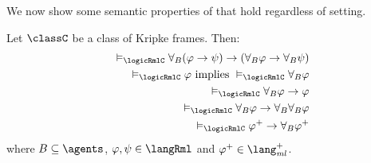 We now show some semantic properties of \logicRml{} that hold regardless of setting.

\begin{proposition}\label{rml-validities}
Let $\classC$ be a class of Kripke frames. Then:
\begin{eqnarray}
    &&\entails_\logicRmlC \allrefsBs (\phi \implies \psi) \implies (\allrefsBs \phi \implies \allrefsBs \psi) \label{rml-validity-r}\\
    &&\entails_\logicRmlC \phi \text{ implies } \entails_\logicRmlC \allrefsBs \phi \label{rml-validity-necr}\\
    &&\entails_\logicRmlC \allrefsBs \phi \implies \phi \label{rml-validity-rt}\\
    &&\entails_\logicRmlC \allrefsBs \phi \implies \allrefsBs \allrefsBs \phi \label{rml-validity-r4}\\
    &&\entails_\logicRmlC \phi^+ \implies \allrefsBs \phi^+ \label{rml-validity-rp}
\end{eqnarray}
where $\agentsB \subseteq \agents$, $\phi, \psi \in \langRml$ and $\phi^+ \in \langMlPlus$.
\end{proposition}

